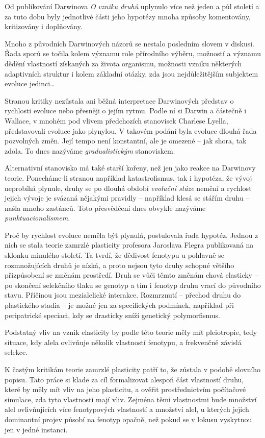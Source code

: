 Od publikování Darwinova \textit{O vzniku druhů} uplynulo více než jeden a půl století a za tuto dobu byly jednotlivé části
jeho hypotézy mnoha způsoby komentovány, kritizovány i doplňovány.

Mnoho z původních Darwinových názorů se nestalo posledním slovem v diskusi. Řada sporů se točila kolem významu role
přírodního výběru, možností a významu dědění vlastností získaných za života organismu, možnosti vzniku některých
adaptivních struktur i kolem základní otázky, zda jsou nejdůležitějším subjektem evoluce jedinci\ldots

%

Stranou kritiky nezůstala ani běžná interpretace Darwinových představ o rychlosti evoluce nebo přesněji o jejím rytmu.
Podle ní si Darwin a částečně i Wallace, v mnohém pod vlivem předchozích stanovisek Charlese Lyella,
představovali evoluce jako plynylou. V takovém podání byla evoluce dlouhá řada pozvolných změn. Její tempo není
konstantní, ale je omezené -- jak shora, tak zdola. To dnes nazýváme \textit{gradualistickým} stanoviskem.

Alternativní stanovisko má také starší kořeny, než jen jako reakce na Darwinovy teorie. Ponecháme-li stranou například
katastrofismus, tak i hypotéza, že vývoj neprobíhá plynule, druhy se po dlouhá období \textit{evoluční stáze} nemění
a rychlost jejich vývoje je svázaná nějakými pravidly -- například klesá se stářím druhu -- našla mnoho zastánců.
Toto přesvědčení dnes obvykle nazýváme \textit{punktuacionalismem}.

Proč by rychlost evoluce neměla být plynulá, postulovala řada hypotéz. Jednou z nich se stala teorie zamrzlé plasticity
profesora Jaroslava Flegra publikovaná na sklonku minulého století. Ta tvrdí, že dědivost fenotypu u pohlavně se
rozmnožujících druhů je nízká, a proto nejsou tyto druhy schopné většího přizpůsobení se změnám prostředí. Druh se vůči
těmto změnám chová elasticky -- po skončení selekčního tlaku se genotyp a tím i fenotyp druhu vrací do původního stavu.
Příčinou jsou mezialelické interakce. Rozmrznutí -- přechod druhu do plastického stadia -- je možné jen za specifických
podmínek, například při peripatrické speciaci, kdy se drasticky sníží genetický polymorfismus.

Podstatný vliv na vznik elasticity by podle této teorie měly mít pleiotropie, tedy situace, kdy alela ovlivňuje
několik vlastností fenotypu, a frekvenčně závislá selekce.

K častým kritikám teorie zamrzlé plasticity patří to, že zůstala v podobě slovního popisu. Tato práce si
klade za cíl formalizovat alespoň část vlastností druhu, které by měly mít vliv na jeho plasticitu, a ověřit
prostřednictvím počítačové simulace, zda tyto vlastnosti mají vliv. Zejména těmi vlastnostmi bude množství alel
ovlivňujících více fenotypových vlastností a množství alel, u kterých jejich dominantní projev působí na fenotyp
opačně, než pokud se v lokusu vyskytnou jen v jedné instanci.
